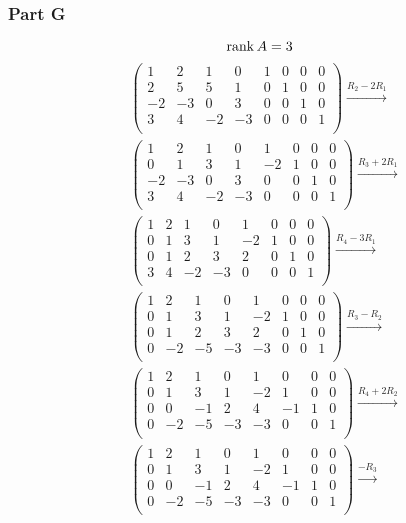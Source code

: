 \documentclass[12pt,titlepage]{extarticle}
\begin{document}
\subsubsection*{Part G}
\[
    \rank A = 3
\]
\begin{align*}
    & \left(\begin{array}{cccccccc}1&2&1&0&1&0&0&0\\2&5&5&1&0&1&0&0\\-2&-3&0&3&0&0&1&0\\3&4&-2&-3&0&0&0&1\\\end{array}\right) \xrightarrow{R_2 - 2 R_1} \\
    & \left(\begin{array}{cccccccc}1&2&1&0&1&0&0&0\\0&1&3&1&-2&1&0&0\\-2&-3&0&3&0&0&1&0\\3&4&-2&-3&0&0&0&1\\\end{array}\right) \xrightarrow{R_3 + 2 R_1} \\
    & \left(\begin{array}{cccccccc}1&2&1&0&1&0&0&0\\0&1&3&1&-2&1&0&0\\0&1&2&3&2&0&1&0\\3&4&-2&-3&0&0&0&1\\\end{array}\right) \xrightarrow{R_4 - 3 R_1} \\
    & \left(\begin{array}{cccccccc}1&2&1&0&1&0&0&0\\0&1&3&1&-2&1&0&0\\0&1&2&3&2&0&1&0\\0&-2&-5&-3&-3&0&0&1\\\end{array}\right) \xrightarrow{R_3 - R_2} \\
    & \left(\begin{array}{cccccccc}1&2&1&0&1&0&0&0\\0&1&3&1&-2&1&0&0\\0&0&-1&2&4&-1&1&0\\0&-2&-5&-3&-3&0&0&1\\\end{array}\right) \xrightarrow{R_4 + 2 R_2} \\
    & \left(\begin{array}{cccccccc}1&2&1&0&1&0&0&0\\0&1&3&1&-2&1&0&0\\0&0&-1&2&4&-1&1&0\\0&-2&-5&-3&-3&0&0&1\\\end{array}\right) \xrightarrow{-R_3} \\

\end{align*}
\end{document}
